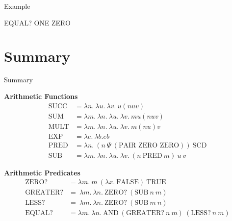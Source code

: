 \documentclass{beamer}
\begin{document}
\begin{frame}{Example}

    EQUAL? ONE ZERO
    \vspace{6cm}
    
\end{frame}

\section{Summary}

\begin{frame}{Summary}

{\bf Arithmetic Functions}
\begin{align*}
    \text{SUCC} &= \lambda n. \ \lambda u. \ \lambda v. \ u(nuv) \\
    \text{SUM} &= \lambda m. \ \lambda n. \ \lambda u. \ \lambda v. \ mu(nuv)\\
    \text{MULT} &= \lambda m. \ \lambda n. \ \lambda u. \ \lambda v. \ m(nu)v \\
    \text{EXP} &= \lambda e. \ \lambda b. eb \ \\
    \text{PRED} &= \lambda n.  \ (n \ \Psi \ (\text{PAIR ZERO ZERO})) \ \text{SCD}  \\
    \text{SUB} &= \lambda m. \ \lambda n. \ \lambda u. \ \lambda v. \ (n \ \text{PRED} \ m) \ u \ v
\end{align*}

{\bf Arithmetic Predicates}
\begin{align*}
    \text{ZERO?} &= \lambda m. \ m \ (\lambda x. \ \text{FALSE}) \ \text{TRUE} \ \\
    \text{GREATER?} &= \ \lambda m. \ \lambda n. \ \text{ZERO?} \ (\text{SUB} \ n \ m) \\
    \text{LESS?} &= \ \lambda m. \ \lambda n. \ \text{ZERO?} \ (\text{SUB} \ m \ n) \\
    \text{EQUAL?} &= \lambda m. \ \lambda n. \ \text{AND} \ (\text{GREATER?} \ n \ m) \ (\text{LESS?} \ n \ m) 
\end{align*}

    
\end{frame}
\end{document}
